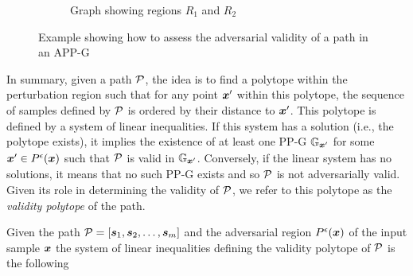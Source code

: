 \begin{figure}[h]
\begin{subfigure}{0.5\linewidth}
    \captionsetup{justification=centering}
    \caption{Graph showing regions $R_1$ and $R_2$}
    \label{subfig:R2-region}
  \end{subfigure}

  \caption[Example showing how to assess the adversarial validity of a path in a \acs{APP-G}]{Example showing how to assess the adversarial validity of a path in an \acs{APP-G}}
  \label{fig:adv-validity-regions}
\end{figure}

\noindent In summary, given a path $\vpath$, the idea is to find a polytope within the perturbation region such that for any point $\x[]'$ within this polytope, the sequence of samples defined by $\vpath$ is ordered by their distance to $\x[]'$. This polytope is defined by a system of linear inequalities. If this system has a solution (i.e., the polytope exists), it implies the existence of at least one \acs{PP-G} $\PPG[{\x[]'}]$ for some $\x[]' \in \pert$ such that $\vpath$ is valid in $\PPG[{\x[]'}]$. Conversely, if the linear system has no solutions, it means that no such \acs{PP-G} exists and so $\vpath$ is not adversarially valid. Given its role in determining the validity of $\vpath$, we refer to this polytope as the \emph{validity polytope} of the path.

Given the path $\vpath = [\sample[1], \sample[2],\ldots, \sample[m]]$ and the adversarial region $\pert$ of the input sample $\vinput$ the system of linear inequalities defining the validity polytope of $\vpath$ is the following

